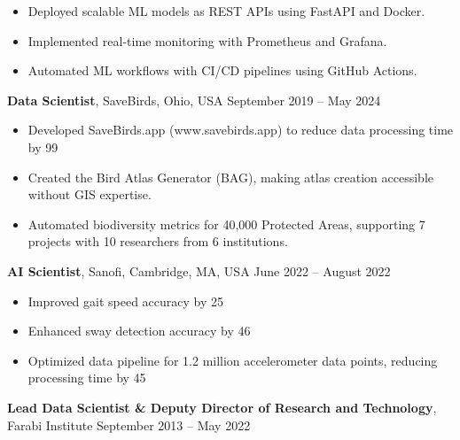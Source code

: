 \documentclass[a4paper,10pt]{article}
\begin{document}
\begin{itemize}
    \item Deployed scalable ML models as REST APIs using FastAPI and Docker.
    
    \item Implemented real-time monitoring with Prometheus and Grafana.
    
    \item Automated ML workflows with CI/CD pipelines using GitHub Actions.
\end{itemize}

\vspace{4pt}
{\bfseries Data Scientist}, SaveBirds, Ohio, USA \hfill September 2019 -- May 2024

\begin{itemize}
    \item Developed SaveBirds.app (www.savebirds.app) to reduce data processing time by 99%
    
    \item Created the Bird Atlas Generator (BAG), making atlas creation accessible without GIS expertise.
    
    \item Automated biodiversity metrics for 40,000 Protected Areas, supporting 7 projects with 10 researchers from 6 institutions.
\end{itemize}

\vspace{4pt}
{\bfseries AI Scientist}, Sanofi, Cambridge, MA, USA \hfill June 2022 -- August 2022

\begin{itemize}
    \item Improved gait speed accuracy by 25%
    
    \item Enhanced sway detection accuracy by 46%
    
    \item Optimized data pipeline for 1.2 million accelerometer data points, reducing processing time by 45%
\end{itemize}

\vspace{4pt}
{\bfseries Lead Data Scientist \& Deputy Director of Research and Technology}, Farabi Institute \hfill September 2013 -- May 2022
\end{document}
